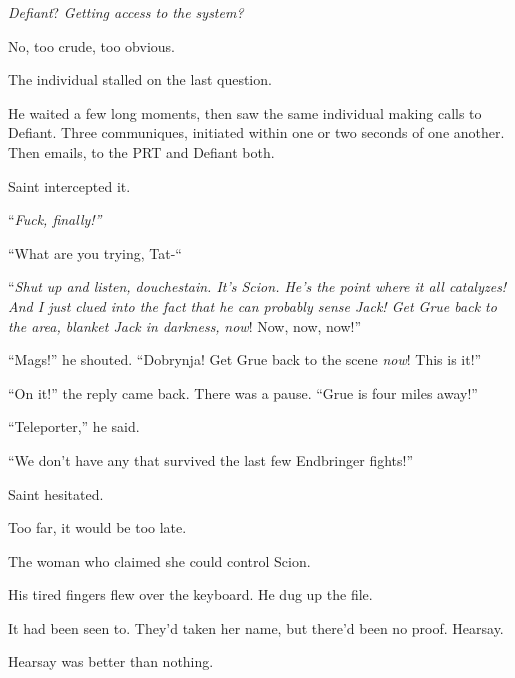 \emph{Defiant}?  \emph{Getting access to the system?}



No, too crude, too obvious.



The individual stalled on the last question.



He waited a few long moments, then saw the same individual making calls to Defiant.  Three communiques, initiated within one or two seconds of one another.  Then emails, to the PRT and Defiant both.



Saint intercepted it.



``\emph{Fuck, finally!''}



``What are you trying, Tat-``



``\emph{Shut up and listen, douchestain.  It's Scion.  He's the point where it all catalyzes!  And I just clued into the fact that he can probably sense Jack!  Get Grue back to the area, blanket Jack in darkness, }\emph{now}!  Now, now, now!''



``Mags!'' he shouted.  ``Dobrynja!  Get Grue back to the scene \emph{now}!  This is it!''



``On it!'' the reply came back.  There was a pause.  ``Grue is four miles away!''



``Teleporter,'' he said.



``We don't have any that survived the last few Endbringer fights!''



Saint hesitated.



Too far, it would be too late.



The woman who claimed she could control Scion.



His tired fingers flew over the keyboard.  He dug up the file.



It had been seen to.  They'd taken her name, but there'd been no proof.  Hearsay.



Hearsay was better than nothing.



